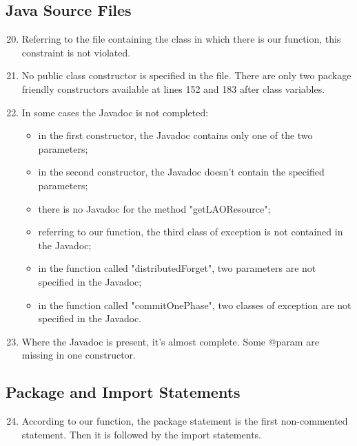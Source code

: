 \subsection{Java Source Files}
\begin{enumerate}
	\setcounter{enumi}{19}
	\item Referring to the file containing the class in which there is our function, this constraint is not violated.
	\item No public class constructor is specified in the file. There are only two package friendly constructors available at lines 152 and 183 after class variables.
	\item In some cases the Javadoc is not completed:
	    \begin{itemize}
	        \item in the first constructor, the Javadoc contains only one of the two parameters;
	        \item in the second constructor, the Javadoc doesn't contain the specified parameters;
	        \item there is no Javadoc for the method "getLAOResource";
	        \item referring to our function, the third class of exception is not contained in the Javadoc;
	        \item in the function called "distributedForget", two parameters are not specified in the Javadoc;
	        \item in the function called "commitOnePhase", two classes of exception are not specified in the Javadoc.
	    \end{itemize}
	\item Where the Javadoc is present, it's almost complete. Some @param are missing in one constructor.
\end{enumerate}
\subsection{Package and Import Statements}
\begin{enumerate}
	\setcounter{enumi}{23}
	\item According to our function, the package statement is the first non-commented statement. Then it is followed by the import statements.
\end{enumerate}
